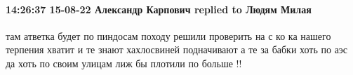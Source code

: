  
 
 
 
 

\paragraph{14:26:37 15-08-22 Александр Карпович replied to Людям Милая}

там атветка будет по пиндосам походу решили проверить на с ко ка нашего
терпения хватит и те знают хахлосвиней подначивают а те за бабки хоть по аэс да
хоть по своим улицам лиж бы плотили по больше !!
